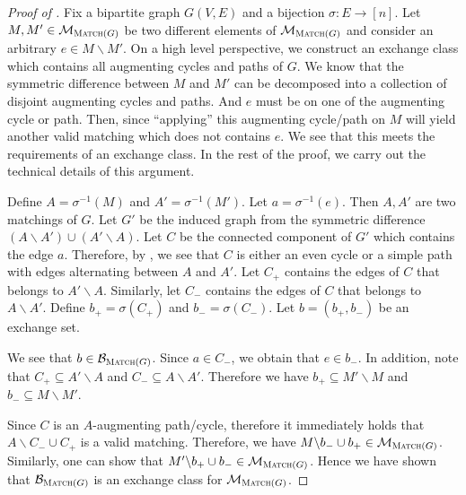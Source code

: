\documentclass{article}
\newcommand{\junk}[1]{}
\newcommand{\M}{\mathcal M}
\newcommand{\B}{\mathcal B}
\newcommand{\del}{\backslash}
\DeclareMathOperator{\rank}{width}
\newcommand{\Match}{\textsc{Match}\xspace}
\begin{document}
\begin{proof}[Proof of ]
Fix  a bipartite graph $G(V,E)$ and a bijection $\sigma\colon E\rightarrow [n]$. 
Let $M,M' \in \M_{\Match(G)}$ be two different elements of $\M_{\Match(G)}$ and consider an arbitrary $e\in M\del M'$.
On a high level perspective, we construct an exchange class which contains all augmenting cycles and paths of $G$.
We know that the symmetric difference between $M$ and $M'$ can be decomposed into a collection of disjoint augmenting cycles and paths. 
And $e$ must be on one of the augmenting cycle or path. 
Then, since ``applying'' this augmenting cycle/path on $M$ will yield another valid matching which does not contains $e$. 
We see that this meets the requirements of an exchange class.
In the rest of the proof, we carry out the technical details of this argument.



Define $A=\sigma^{-1}(M)$ and $A'=\sigma^{-1}(M')$. 
Let $a=\sigma^{-1}(e)$.
Then $A,A'$ are two matchings of $G$. 
Let $G'$ be the induced graph from the symmetric difference $(A\del A')\cup(A'\del A)$.
Let $C$ be the connected component of $G'$ which contains the edge $a$.
Therefore, by , we see that $C$ is either an even cycle or a  simple path with edges alternating between $A$ and $A'$.
Let $C_+$ contains the edges of $C$ that belongs to $A'\del A$.
Similarly, let $C_-$ contains the edges of $C$ that belongs to $A\del A'$.
Define $b_+ = \sigma(C_+)$ and $b_-=\sigma(C_-)$.
Let $b=(b_+,b_-)$ be an exchange set.

\junk{
Now we construct the exchange class.
Let $\mathcal C$ be the set of all cycles in $G$.
Let $\mathcal P$ be the set of all paths in $G$.
We define $\B_{\Match(G)}$ to correspond to the set of all cycles and all paths of $G$ with edges alternating between $b_+$ and $b_-$.
Formally, we have
$$
\B_{\Match(G)} = \Big\{(\sigma(c_+),\sigma(c_-)) \mid \exists c\in \mathcal C\cup P,\; \text{the edges of }c\text{ alternate between } c_+,c_-\Big\}.
$$
}

We see that $b\in \B_{\Match(G)}$.
Since $a\in C_-$, we obtain that $e\in b_-$.
In addition, note that $C_+ \subseteq A'\del A$ and $C_- \subseteq A\del A'$.
Therefore we have $b_+ \subseteq M'\del M$ and $b_- \subseteq M\del M'$.

Since $C$ is an $A$-augmenting path/cycle, therefore it immediately holds that $A\del C_-\cup C_+$ is a valid matching.
Therefore, we have $M\del b_- \cup b_+ \in \M_{\Match(G)}$.
Similarly, one can show that $M'\del b_+ \cup b_-\in \M_{\Match(G)}$.
Hence we have shown that $\B_{\Match(G)}$ is an exchange class for $\M_{\Match(G)}$.
\end{proof}
\end{document}
